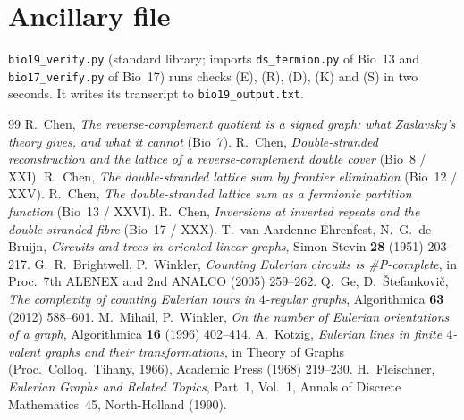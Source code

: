\documentclass[11pt]{article}
\theoremstyle{plain}
\theoremstyle{definition}
\theoremstyle{remark}
\begin{document}
\section*{Ancillary file}
\texttt{bio19\_verify.py} (standard library; imports \texttt{ds\_fermion.py} of Bio~13 and
\texttt{bio17\_verify.py} of Bio~17) runs checks (E), (R), (D), (K) and (S) in two seconds. It writes
its transcript to \texttt{bio19\_output.txt}.

\begin{thebibliography}{99}
 R.~Chen, \emph{The reverse-complement quotient is a signed graph: what Zaslavsky's theory
gives, and what it cannot} (Bio~7).
 R.~Chen, \emph{Double-stranded reconstruction and the lattice of a reverse-complement
double cover} (Bio~8 / XXI).
 R.~Chen, \emph{The double-stranded lattice sum by frontier elimination} (Bio~12 / XXV).
 R.~Chen, \emph{The double-stranded lattice sum as a fermionic partition function}
(Bio~13 / XXVI).
 R.~Chen, \emph{Inversions at inverted repeats and the double-stranded fibre}
(Bio~17 / XXX).
 T.~van Aardenne-Ehrenfest, N.~G.~de Bruijn, \emph{Circuits and trees in oriented linear
graphs}, Simon Stevin \textbf{28} (1951) 203--217.
 G.~R.~Brightwell, P.~Winkler, \emph{Counting Eulerian circuits is \#P-complete}, in
Proc.\ 7th ALENEX and 2nd ANALCO (2005) 259--262.
 Q.~Ge, D.~\v Stefankovi\v c, \emph{The complexity of counting Eulerian tours in
$4$-regular graphs}, Algorithmica \textbf{63} (2012) 588--601.
 M.~Mihail, P.~Winkler, \emph{On the number of Eulerian orientations of a graph},
Algorithmica \textbf{16} (1996) 402--414.
 A.~Kotzig, \emph{Eulerian lines in finite $4$-valent graphs and their transformations},
in Theory of Graphs (Proc.\ Colloq.\ Tihany, 1966), Academic Press (1968) 219--230.
 H.~Fleischner, \emph{Eulerian Graphs and Related Topics}, Part~1, Vol.~1, Annals of
Discrete Mathematics~45, North-Holland (1990).
\end{thebibliography}
\end{document}
